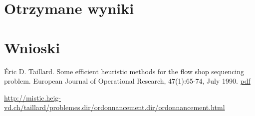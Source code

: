\documentclass[11pt, a4wide]{article}
\begin{document}
\section{Otrzymane wyniki}



\section{Wnioski}




\begin{thebibliography}{}
Éric D. Taillard. 
Some efficient heuristic methods for the flow shop sequencing problem. 
European Journal of Operational Research, 47(1):65-74, July 1990.
\href{http://mistic.heig-vd.ch/taillard/articles.dir/Taillard1990.pdf}{pdf}

\url{http://mistic.heig-vd.ch/taillard/problemes.dir/ordonnancement.dir/ordonnancement.html}

\end{thebibliography}
\end{document}
